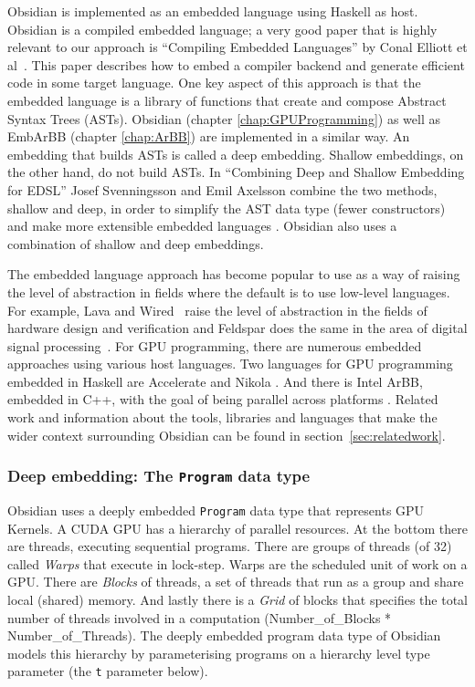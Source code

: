 \documentclass[a4paper]{book}
\begin{document}
Obsidian is implemented as an embedded language using Haskell as host. Obsidian 
is a compiled embedded language; a very good paper that is highly relevant to our 
approach is ``Compiling Embedded Languages'' by Conal Elliott et al~\citet{COMPILEEDSL}. 
This paper describes how to embed a compiler backend and generate efficient code 
in some target language. One key aspect of this approach is that the embedded 
language is a library of functions that create and compose Abstract Syntax Trees 
(ASTs). Obsidian (chapter \ref{chap:GPUProgramming}) as well as EmbArBB 
(chapter \ref{chap:ArBB}) are implemented in a similar way. An embedding that builds 
ASTs is called a deep embedding. Shallow embeddings, on the other hand, do not build 
ASTs. In ``Combining Deep and Shallow Embedding for EDSL'' Josef Svenningsson and 
Emil Axelsson combine the two methods, shallow and deep, in order to simplify the 
AST data type (fewer constructors) and make more extensible embedded languages 
\citet{DEEPSHALLOW}. Obsidian also uses a combination of shallow 
and deep embeddings. 

The embedded language approach has become popular to use as a way of raising the 
level of abstraction in fields where the default is to use low-level languages. 
For example, Lava and Wired~\citet{LAVA,Wired} raise the level of abstraction in the 
fields of hardware design and verification and Feldspar does the same in the area of  
digital signal processing~\citet{FELDSPAR2010}. For GPU programming, there are numerous 
embedded approaches using various host languages. Two languages for GPU programming 
embedded in Haskell are  Accelerate and Nikola \citet{ACCELERATEDAMP11, NIKOLA}. 
And there is Intel ArBB, embedded in C++, with the goal of being parallel across 
platforms \citet{ARBB2011}. Related work and information about the tools, libraries 
and languages that make the wider context surrounding Obsidian can be found in 
section~\ref{sec:relatedwork}. 

\subsubsection{Deep embedding: The {\tt Program} data type}

Obsidian uses a deeply embedded {\tt Program} data type that represents GPU Kernels. 
A CUDA GPU has a hierarchy of parallel resources. At the bottom there are threads,  
executing sequential programs. There are groups of threads (of 32) called {\em Warps} that 
execute in lock-step. Warps are the scheduled unit of work on a GPU. There are {\em Blocks} 
of threads, a set of threads that run as a group and share local (shared) memory. And 
lastly there is a {\em Grid} of blocks that specifies the total number of threads involved 
in a computation (Number\_of\_Blocks * Number\_of\_Threads). The deeply embedded program 
data type of Obsidian models this hierarchy by parameterising programs on a hierarchy 
level type parameter (the  {\tt t} parameter below).
\end{document}
